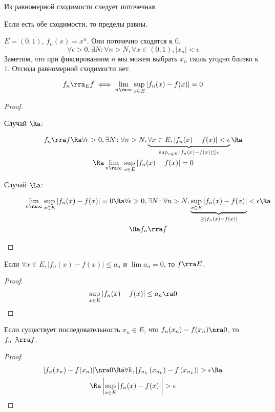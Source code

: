 \begin{Rem}
	Из равномерной сходимости следует поточечная.
\end{Rem}
\begin{Rem}
	Если есть обе сходимости, то пределы равны.
\end{Rem}

\begin{exmp}
	$E = (0, 1)$, $f_n(x) = x^n$.
	Они поточечно сходятся к $0$.
	\[ \forall \epsilon > 0, \exists N\colon \forall n > N, \forall x \in (0, 1), |x_n| < \epsilon \]
	Заметим, что при фиксированном $n$ мы можем выбрать $x_n$ сколь угодно близко к 1.
	Отсюда равномерной сходимости нет.
\end{exmp}

\begin{theorem}
	\[ f_n \rra_E f \iff \lim_{n\ra\infty} \sup_{x \in E} |f_n(x) - f(x)| = 0 \]
\end{theorem}
\begin{proof}
	\begin{description}
	\item[Случай $\Ra$:]
		\begin{gather*}
			f_n \rra f
			\Ra \forall \epsilon > 0, \exists N\colon \forall n > N, \underbrace{\forall x \in E, |f_n(x) - f(x)| < \epsilon}_{\sup_{x \in E} |f_n(x) - f(x)| \le \epsilon} \Ra \\
			\Ra \lim_{n\ra\infty} \sup_{x \in E} |f_n(x) - f(x)| = 0
		\end{gather*}

	\item[Случай $\La$:]
		\begin{gather*}
			\lim_{n\ra\infty} \sup_{x \in E} |f_n(x) - f(x)| = 0
			\Ra \forall \epsilon > 0, \exists N\colon \forall n > N, \underbrace{\sup_{x \in E} |f_n(x) - f(x)|}_{\ge |f_n(x) - f(x)|} < \epsilon \Ra \\
			\Ra f_n \rra f
		\end{gather*}
	\end{description}
\end{proof}

\begin{conseq}
	Если $\forall x \in E, |f_n(x) - f(x)| \le a_n$ и $\lim a_n = 0$, то $f \rra E$.
\end{conseq}
\begin{proof}
	\[ \sup_{x \in E} |f_n(x) - f(x)| \le a_n \ra 0 \]
\end{proof}

\begin{conseq}
	Если существует последовательность $x_n \in E$, что $f_n(x_n) - f(x_n) \nra 0$, то $f_n \not\rra f$.
\end{conseq}
\begin{proof}
	\begin{gather*}
		|f_n(x_n) - f(x_n)| \nra 0
		\Ra \forall k, \left|f_{n_k}\left(x_{n_k}\right) - f\left(x_{n_k}\right)\right| > \epsilon \Ra \\
		\Ra \left| \sup_{x \in E} |f_n(x) - f(x)| \right| > \epsilon
	\end{gather*}
\end{proof}

